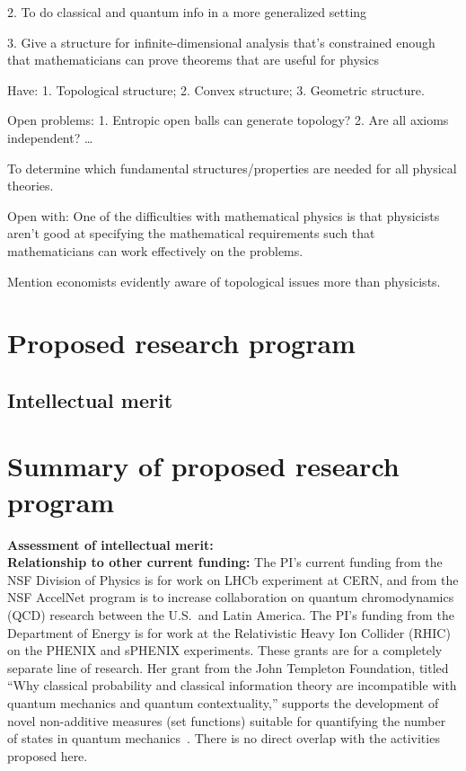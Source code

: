 2. To do classical and quantum info in a more generalized setting

3. Give a structure for infinite-dimensional analysis that’s constrained enough that mathematicians can prove theorems that are useful for physics

Have: 1. Topological structure; 2. Convex structure; 3. Geometric structure.  

Open problems: 1. Entropic open balls can generate topology? 2. Are all axioms independent?   …

To determine which fundamental structures/properties are needed for all physical theories.

Open with: One of the difficulties with mathematical physics is that physicists aren’t good at specifying the mathematical requirements such that mathematicians can work effectively on the problems.

Mention economists evidently aware of topological issues more than physicists.



\section{Proposed research program}

\subsection{Intellectual merit}



\section{Summary of proposed research program}


\noindent
\textbf{Assessment of intellectual merit:} \\

\noindent
\textbf{Relationship to other current funding:} The PI's current funding from the NSF Division of Physics is for work on LHCb experiment at CERN, and from the NSF AccelNet program is to increase collaboration on quantum chromodynamics (QCD) research between the U.S.~and Latin America.  The PI's funding from the Department of Energy is for work at the Relativistic Heavy Ion Collider (RHIC) on the PHENIX and sPHENIX experiments.  These grants are for a completely separate line of research. Her grant from the John Templeton Foundation, titled ``Why classical probability and classical information theory are incompatible with quantum mechanics and quantum contextuality,'' supports the development of novel non-additive measures (set functions) suitable for quantifying the number of states in quantum mechanics~\cite{aop-nonaddmeas}.  There is no direct overlap with the activities proposed here.  \\


